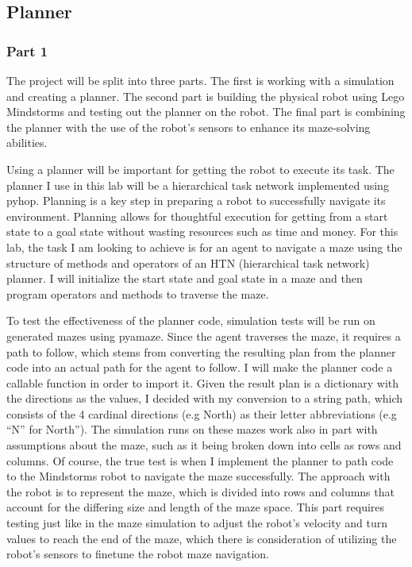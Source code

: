 \documentclass[10pt,twocolumn]{article}
\begin{document}
\subsection{Planner}
\subsubsection{Part 1}
The project will be split into three parts. The first is working with a simulation and creating a planner. The second part is building the physical robot using Lego Mindstorms and testing out the planner on the robot. The final part is combining the planner with the use of the robot's sensors to enhance its maze-solving abilities. 

Using a planner will be important for getting the robot to execute its task. The planner I use in this lab will be a hierarchical task network implemented using pyhop. Planning is a key step in preparing a robot to successfully navigate its environment. Planning allows for thoughtful execution for getting from a start state to a goal state without wasting resources such as time and money. For this lab, the task I am looking to achieve is for an agent to navigate a maze using the structure of methods and operators of an HTN (hierarchical task network) planner. I will initialize the start state and goal state in a maze and then program operators and methods to traverse the maze.

To test the effectiveness of the planner code, simulation tests will be run on generated mazes using pyamaze. Since the agent traverses the maze, it requires a path to follow, which stems from converting the resulting plan from the planner code into an actual path for the agent to follow. I will make the planner code a callable function in order to import it. Given the result plan is a dictionary with the directions as the values, I decided with my conversion to a string path, which consists of the 4 cardinal directions (e.g North) as their letter abbreviations (e.g “N” for North”). The simulation runs on these mazes work also in part with assumptions about the maze, such as it being broken down into cells as rows and columns. Of course, the true test is when I implement the planner to path code to the Mindstorms robot to navigate the maze successfully. The approach with the robot is to represent the maze, which is divided into rows and columns that account for the differing size and length of the maze space. This part requires testing just like in the maze simulation to adjust the robot’s velocity and turn values to reach the end of the maze, which there is consideration of utilizing the robot’s sensors to finetune the robot maze navigation.
\end{document}
